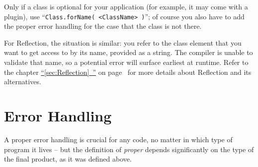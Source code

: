 \documentclass[11pt,a4paper, titlepage, parskip=half, headsepline, footsepline, cleardoublepage=current, headheight=1cm]{scrbook}
\newcommand*{\tqfullvref}[1]{\hyperref[{#1}]{“\ref*{#1}~\nameref*{#1}”} on page~\pageref{#1}}
\begin{document}
Only if a class is optional for your application (for example, it may come with a plugin), use “\lstinline|Class.forName( <ClassName> )|”; of course you also have to add the proper error handling for the case that the class is not there.

For Reflection, the situation is similar: you refer to the class element that you want to get access to by its name, provided as a string. The compiler is unable to validate that name, so a potential error will surface earliest at runtime. Refer to the chapter \tqfullvref{sec:Reflection} for more details about Reflection and its alternatives.


\section{Error Handling}\label{sec:ErrorHandling}
A proper error handling is crucial for any code, no matter in which type of program it lives – but the definition of \textit{proper} depends significantly on the type of the final product, as it was defined above.
\end{document}
